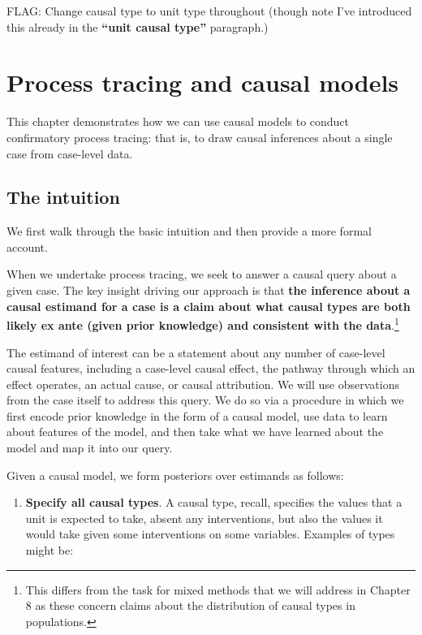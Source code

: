 \documentclass[12pt,]{book}
\providecommand{\tightlist}{%
  \setlength{\itemsep}{0pt}\setlength{\parskip}{0pt}}
\let\rmarkdownfootnote\footnote%
\def\footnote{\protect\rmarkdownfootnote}
\begin{document}
FLAG: Change causal type to unit type throughout (though note I've introduced this already in the \textbf{``unit causal type''} paragraph.)

\hypertarget{process-tracing-and-causal-models}{%
\section{Process tracing and causal models}\label{process-tracing-and-causal-models}}

This chapter demonstrates how we can use causal models to conduct confirmatory process tracing: that is, to draw causal inferences about a single case from case-level data.

\hypertarget{the-intuition}{%
\subsection{The intuition}\label{the-intuition}}

We first walk through the basic intuition and then provide a more formal account.

When we undertake process tracing, we seek to answer a causal query about a given case.
The key insight driving our approach is that \textbf{the inference about a causal estimand for a case is a claim about what causal types are both likely ex ante (given prior knowledge) and consistent with the data}.\footnote{This differs from the task for mixed methods that we will address in Chapter 8 as these concern claims about the distribution of causal types in populations.}

The estimand of interest can be a statement about any number of case-level causal features, including a case-level causal effect, the pathway through which an effect operates, an actual cause, or causal attribution. We will use observations from the case itself to address this query. We do so via a procedure in which we first encode prior knowledge in the form of a causal model, use data to learn about features of the model, and then take what we have learned about the model and map it into our query.

Given a causal model, we form posteriors over estimands as follows:

\begin{enumerate}
\def\labelenumi{\arabic{enumi}.}
\tightlist
\item
  \textbf{Specify all causal types}. A causal type, recall, specifies the values that a unit is expected to take, absent any interventions, but also the values it would take given some interventions on some variables. Examples of types might be:
\end{enumerate}
\end{document}
